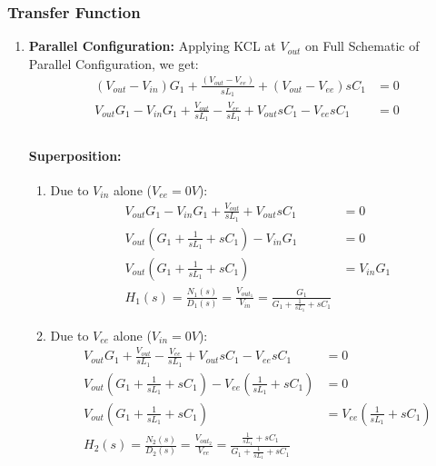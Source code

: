 \subsubsection{Transfer Function}
\begin{enumerate}
  \item \textbf{Parallel Configuration:}
    Applying KCL at $V_{out}$ on Full Schematic of Parallel
    Configuration, we get:
    \begin{align*}
      (V_{out} - V_{in}){G_1} + \frac{(V_{out} - V_{ee})}{sL_1} + (V_{out} - V_{ee}){sC_1} &= 0 \\
      V_{out}G_1 - V_{in}G_1 + \frac{V_{out}}{sL_1} - \frac{V_{ee}}{sL_1} + V_{out}sC_1 - V_{ee}sC_1 &= 0 \\
    \end{align*}
    \paragraph{Superposition:}
      \begin{enumerate}
        \item Due to \(V_{in}\) alone (\(V_{ee} = 0V\)):
          \begin{align*}
            V_{out}G_1 - V_{in}G_1 + \frac{V_{out}}{sL_1} + V_{out}sC_1 &= 0 \\
            V_{out}(G_1 + \frac{1}{sL_1} + sC_1) - V_{in}G_1 &= 0 \\
            V_{out}(G_1 + \frac{1}{sL_1} + sC_1) &= V_{in}G_1 \\
            \boxed{H_1(s) = \frac{N_1(s)}{D_1(s)} = \frac{V_{out_1}}{V_{in}} = \frac{G_1}{G_1 + \frac{1}{sL_1} + sC_1}}
          \end{align*}
        \item Due to \(V_{ee}\) alone (\(V_{in} = 0V\)):
          \begin{align*}
            V_{out}G_1 + \frac{V_{out}}{sL_1} - \frac{V_{ee}}{sL_1} + V_{out}sC_1 - V_{ee}sC_1 &= 0 \\
            V_{out}(G_1 + \frac{1}{sL_1} + sC_1) - V_{ee}(\frac{1}{sL_1} + sC_1) &= 0 \\
            V_{out}(G_1 + \frac{1}{sL_1} + sC_1) &= V_{ee}(\frac{1}{sL_1} + sC_1) \\
            \boxed{H_2(s) = \frac{N_2(s)}{D_2(s)} = \frac{V_{out_2}}{V_{ee}} = \frac{\frac{1}{sL_1} + sC_1}{G_1 + \frac{1}{sL_1} + sC_1}}
          \end{align*}
      \end{enumerate}

\end{enumerate}
